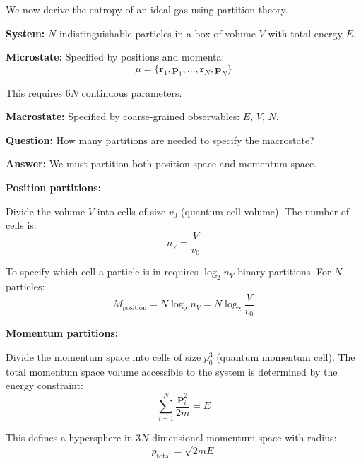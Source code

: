 \documentclass[twocolumn,10pt]{article}
\theoremstyle{definition}
\theoremstyle{remark}
\begin{document}
We now derive the entropy of an ideal gas using partition theory.

\vspace{0.2cm}
\noindent\textbf{System:} $N$ indistinguishable particles in a box of volume $V$ with total energy $E$.

\vspace{0.2cm}
\noindent\textbf{Microstate:} Specified by positions and momenta:
\begin{equation}
\mu = \{\mathbf{r}_1, \mathbf{p}_1, \ldots, \mathbf{r}_N, \mathbf{p}_N\}
\end{equation}

This requires $6N$ continuous parameters.

\vspace{0.2cm}
\noindent\textbf{Macrostate:} Specified by coarse-grained observables: $E$, $V$, $N$.

\vspace{0.2cm}
\noindent\textbf{Question:} How many partitions are needed to specify the macrostate?

\vspace{0.2cm}
\noindent\textbf{Answer:} We must partition both position space and momentum space.

\vspace{0.2cm}
\noindent\textbf{Position partitions:}

Divide the volume $V$ into cells of size $v_0$ (quantum cell volume). The number of cells is:
\begin{equation}
n_V = \frac{V}{v_0}
\end{equation}

To specify which cell a particle is in requires $\log_2 n_V$ binary partitions. For $N$ particles:
\begin{equation}
M_{\text{position}} = N \log_2 n_V = N \log_2 \frac{V}{v_0}
\end{equation}

\vspace{0.2cm}
\noindent\textbf{Momentum partitions:}

Divide the momentum space into cells of size $p_0^3$ (quantum momentum cell). The total momentum space volume accessible to the system is determined by the energy constraint:
\begin{equation}
\sum_{i=1}^{N} \frac{\mathbf{p}_i^2}{2m} = E
\end{equation}

This defines a hypersphere in $3N$-dimensional momentum space with radius:
\begin{equation}
p_{\text{total}} = \sqrt{2mE}
\end{equation}
\end{document}
